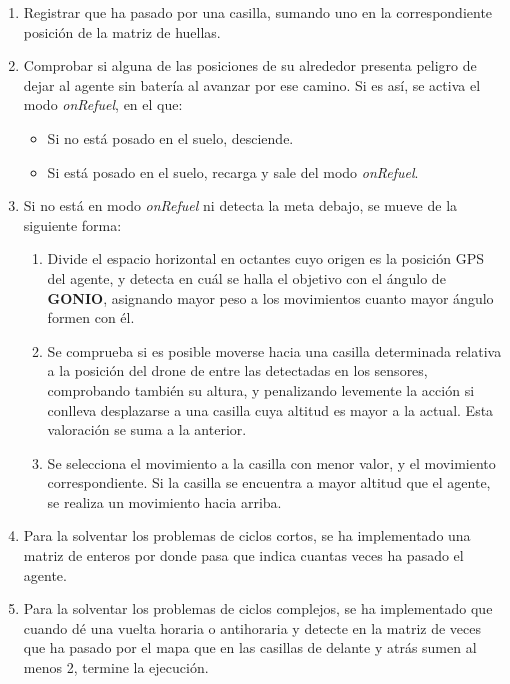\documentclass[11pt,a4paper]{article}
\begin{document}
\begin{enumerate}
	\item Registrar que ha pasado por una casilla, sumando uno en la correspondiente posición de la matriz de huellas.
	\item Comprobar si alguna de las posiciones de su alrededor presenta peligro de dejar al agente sin batería al avanzar por ese camino. Si es así, se activa el modo \textit{onRefuel}, en el que:
	
	\begin{itemize}
		\item Si no está posado en el suelo, desciende.
		\item Si está posado en el suelo, recarga y sale del modo \textit{onRefuel}.
	\end{itemize}
	
	\item Si no está en modo \textit{onRefuel}  ni detecta la meta debajo, se mueve de la siguiente forma:
	\begin{enumerate}
		\item Divide el espacio horizontal en octantes cuyo origen es la posición GPS del agente, y detecta en cuál se halla el objetivo con el ángulo de \textbf{GONIO}, asignando mayor peso a los movimientos cuanto mayor ángulo formen con él.
		\item Se comprueba si es posible moverse hacia una casilla determinada relativa a la posición del drone de entre las detectadas en los sensores, comprobando también su altura, y penalizando levemente la acción si conlleva desplazarse a una casilla cuya altitud es mayor a la actual. Esta valoración se suma a la anterior.
		\item Se selecciona el movimiento a la casilla con menor valor, y el movimiento correspondiente. Si la casilla se encuentra a mayor altitud que el agente, se realiza un movimiento hacia arriba.
	\end{enumerate}
	\item Para la solventar los problemas de ciclos cortos, se ha implementado una matriz de enteros por donde pasa que indica cuantas veces ha pasado el agente.
	
	\item Para la solventar los problemas de ciclos complejos, se ha implementado que cuando dé una vuelta horaria o antihoraria y detecte en la matriz de veces que ha pasado por el mapa que en las casillas de delante y atrás sumen al menos 2, termine la ejecución.
\end{enumerate}
\end{document}
